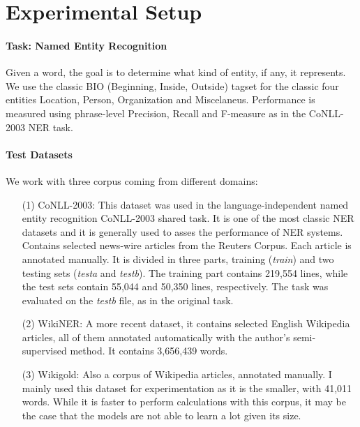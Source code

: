 \documentclass[11pt]{article}
\begin{document}
\section{Experimental Setup}
\paragraph{Task: Named Entity Recognition}
Given a word, the goal is to determine what kind of entity, if any, it represents. We use the classic BIO (Beginning, Inside, Outside) tagset for the classic four entities Location, Person, Organization and Miscelaneus. Performance is measured using phrase-level Precision, Recall and F-measure as in the CoNLL-2003 NER task.
\paragraph{Test Datasets}We work with three corpus coming from different domains:
\begin{itemize}
\item [(1)] CoNLL-2003: This dataset was used in the language-independent named entity recognition CoNLL-2003 shared task. It is one of the most classic NER datasets and it is generally used to asses the performance of NER systems. Contains selected news-wire articles from the Reuters Corpus. Each article is annotated manually. It is divided in three parts,  training (\textit{train}) and two testing sets (\textit{testa} and \textit{testb}). The training part contains 219,554 lines, while the test sets contain 55,044 and 50,350 lines, respectively. The task was evaluated on the \textit{testb} file, as in the original task.
\item [(2)]WikiNER: A more recent dataset, it contains selected English Wikipedia articles, all of them annotated automatically with the author's semi-supervised method. It contains 3,656,439 words. 
\item[(3)] Wikigold: Also a corpus of Wikipedia articles, annotated manually. I mainly used this dataset for experimentation as it is the smaller, with 41,011 words. While it is faster to perform calculations with this corpus, it may be the case that the models are not able to learn a lot given its size.

\end{itemize}
\end{document}
